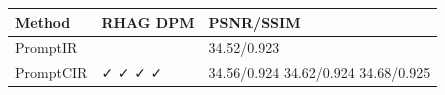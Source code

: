 \begin{tabular}{lll}
\toprule
Method & RHAG DPM & PSNR/SSIM \\
\midrule
PromptIR &  & 34.52/0.923 \\
PromptCIR & ✓ ✓ ✓ ✓ & 34.56/0.924 34.62/0.924 34.68/0.925 \\
\bottomrule
\end{tabular}
